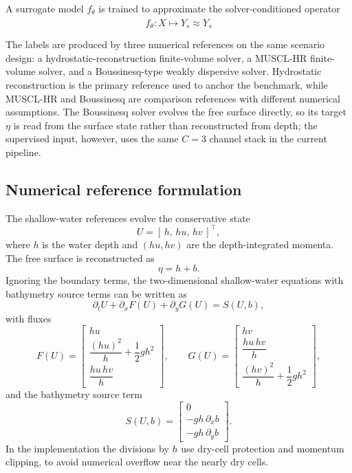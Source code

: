 A surrogate model $f_\theta$ is trained to approximate the solver-conditioned operator
\[
f_\theta : X \mapsto \widehat{Y}_s \approx{Y_s}
\]

The labels are produced by three numerical references on the same scenario design: a hydrostatic-reconstruction finite-volume solver, a MUSCL-HR finite-volume solver, and a Boussinesq-type weakly dispersive solver. Hydrostatic reconstruction is the primary reference used to anchor the benchmark, while MUSCL-HR and Boussinesq are comparison references with different numerical assumptions. The Boussinesq solver evolves the free surface directly, so its target $\eta$ is read from the surface state rather than reconstructed from depth; the supervised input, however, uses the same $C=3$ channel stack in the current pipeline.

\subsection{Numerical reference formulation}
\label{subsec:numerical-reference-formulation}

The shallow-water references evolve the conservative state
\[
U = [\,h,\, hu,\, hv\,]^\top,
\]
where $h$ is the water depth and $(hu, hv)$ are the depth-integrated momenta. The free surface is reconstructed as
\[
\eta = h + b.
\]
Ignoring the boundary terms, the two-dimensional shallow-water equations with bathymetry source terms can be written as
\[
\partial_t U + \partial_x F(U) + \partial_y G(U) = S(U, b),
\]
with fluxes %
\[
F(U) = 
\begin{bmatrix}
    hu \\[2pt]
    \dfrac{(hu) ^ 2}{h} + \dfrac{1}{2}gh ^ 2 \\[6pt]
    \dfrac{hu\, hv}{h}    
\end{bmatrix},
\qquad
G(U) =
\begin{bmatrix}
    hv \\[2pt]
    \dfrac{hu\, hv}{h} \\[6pt]
    \dfrac{(hv) ^ 2}{h} + \dfrac{1}{2}gh ^ 2
\end{bmatrix},
\]
and the bathymetry source term
\[
S(U, b) =
\begin{bmatrix}
    0 \\
    -gh\, \partial_x b \\
    -gh\, \partial_y b
\end{bmatrix}.
\]
In the implementation the divisions by $h$ use dry-cell protection and momentum clipping, to avoid numerical overflow near the nearly dry cells.

